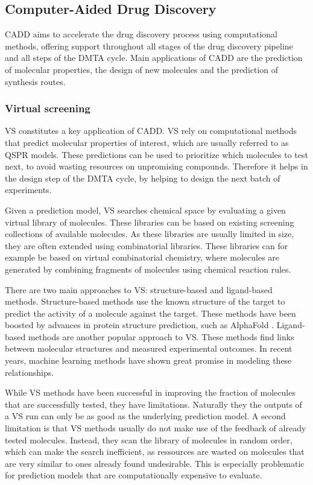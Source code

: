 \subsection{Computer-Aided Drug Discovery}
\ac{CADD} aims to accelerate the drug discovery
process using computational methods, offering support throughout all stages of 
the drug discovery pipeline and all steps of the DMTA cycle.
Main applications of CADD are the prediction of molecular properties, 
the design of new molecules and the prediction of synthesis routes. 

\subsubsection{Virtual screening}
\ac{VS} constitutes a key application of CADD. \ac{VS} rely on computational
methods that predict molecular properties of interest, which are usually
referred to as \ac{QSPR} models. These predictions can be used to prioritize
which molecules to test next, to avoid wasting resources on unpromising
compounds. Therefore it helps in the design step of the DMTA cycle, by helping
to design the next batch of experiments.

Given a prediction model, \ac{VS} searches chemical space by evaluating a 
given virtual library of molecules. These libraries can be based 
on existing screening collections of available molecules. 
As these libraries are usually limited in size, they are often extended 
using combinatorial libraries. These libraries can for example be 
based on virtual combinatorial chemistry, where molecules are generated
by combining fragments of molecules using chemical reaction rules.

There are two main approaches to \ac{VS}: structure-based and ligand-based
methods. Structure-based methods use the known structure of the target to
predict the activity of a molecule against the target. These methods have been
boosted by advances in protein structure prediction, such as AlphaFold
\citep{todo}. Ligand-based methods are another popular approach to \ac{VS}. These
methods find links between molecular structures and measured experimental
outcomes. In recent years, machine learning methods have shown great promise in
modeling these relationships.

While \ac{VS} methods have been successful in improving 
the fraction of molecules that are successfully tested, they have limitations. 
Naturally they the outputs of a \ac{VS} run can only be as good as the
underlying prediction model. A second limitation is that \ac{VS} methods
usually do not make use of the feedback of already tested molecules.
Instead, they scan the library of molecules in random order, which 
can make the search inefficient, as ressources are wasted on molecules
that are very similar to ones already found undesirable.
This is especially problematic for prediction models that are 
computationally expensive to evaluate. 

